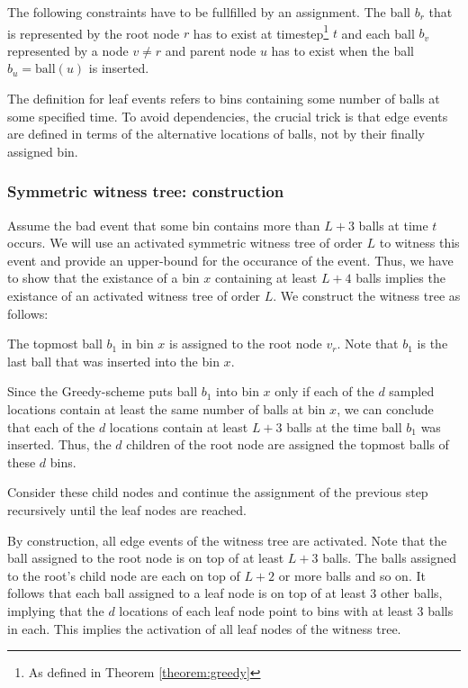 \documentclass[a4paper,12pt]{article}
\begin{document}
The following constraints have to be fullfilled by an assignment. The ball $b_r$ that is represented by the root node $r$ has to exist at timestep\footnote{As defined in Theorem \ref{theorem:greedy}} $t$ and each ball $b_v$ represented by a node $v \neq r$ and parent node $u$ has to exist when the ball $b_u = \mathrm{ball}(u)$ is inserted.

The definition for leaf events refers to bins containing some number of balls at some specified time. To avoid dependencies, the crucial trick is that edge events are defined in terms of the alternative locations of balls, not by their finally assigned bin. 

\subsubsection{Symmetric witness tree: construction}
\label{sec:constructionSymWT}
Assume the bad event that some bin contains more than $L+3$ balls at time $t$ occurs. We will use an activated symmetric witness tree of order $L$ to witness this event and provide an upper-bound for the occurance of the event. Thus, we have to show that the existance of a bin $x$ containing at least $L+4$ balls implies the existance of an activated witness tree of order $L$. We construct the witness tree as follows:
\begin{compactenum}
\item The topmost ball $b_1$ in bin $x$ is assigned to the root node $v_r$. Note that $b_1$ is the last ball that was inserted into the bin $x$.
\item Since the Greedy-scheme puts ball $b_1$ into bin $x$ only if each of the $d$ sampled locations contain at least the same number of balls at bin $x$, we can conclude that each of the $d$ locations contain at least $L+3$ balls at the time ball $b_1$ was inserted. Thus, the $d$ children of the root node are assigned the topmost balls of these $d$ bins.
\item Consider these child nodes and continue the assignment of the previous step recursively until the leaf nodes are reached.  
\end{compactenum}

By construction, all edge events of the witness tree are activated. Note that the ball assigned to the root node is on top of at least $L+3$ balls. The balls assigned to the root's child node are each on top of $L+2$ or more balls and so on. It follows that each ball assigned to a leaf node is on top of at least 3 other balls, implying that the $d$ locations of each leaf node point to bins with at least 3 balls in each. This implies the activation of all leaf nodes of the witness tree.
\end{document}
